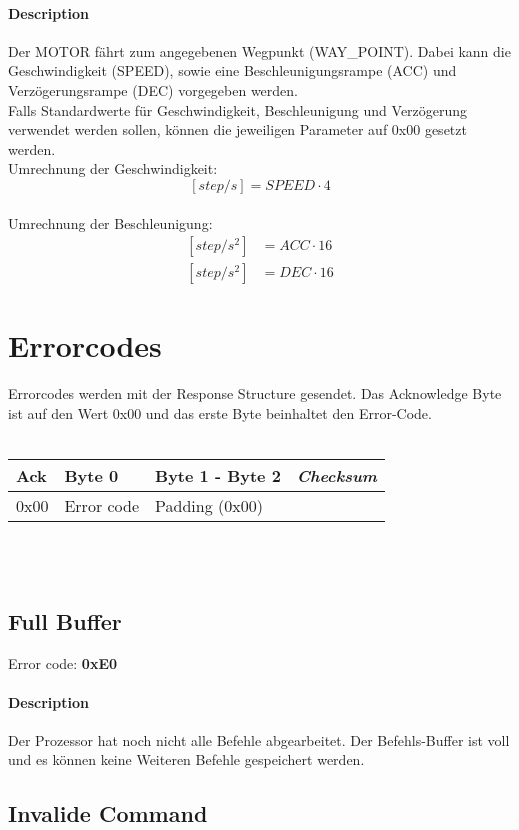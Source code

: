 \documentclass[10pt,a4paper]{article}
\begin{document}
\paragraph*{Description\\}
Der MOTOR fährt zum angegebenen Wegpunkt (WAY\_POINT). Dabei kann die Geschwindigkeit (SPEED), sowie eine Beschleunigungsrampe (ACC) und Verzögerungsrampe (DEC) vorgegeben werden.\\
Falls Standardwerte für Geschwindigkeit, Beschleunigung und Verzögerung verwendet werden sollen, können die jeweiligen Parameter auf 0x00 gesetzt werden.\\
Umrechnung der Geschwindigkeit:
\[
	\left[step/s\right] = SPEED \cdot 4
\]\\
Umrechnung der Beschleunigung:
\[
	\begin{aligned}
		\left[step/s^2\right] &= ACC \cdot 16 \\
		\left[step/s^2\right] &= DEC \cdot 16
	\end{aligned}
\]

\section{Errorcodes}
Errorcodes werden mit der Response Structure gesendet. 
Das Acknowledge Byte ist auf den Wert 0x00 und das erste Byte beinhaltet den Error-Code.\\\\
\begin{tabular}{|p{1.2cm}|p{2cm}|p{4cm}|p{2cm}|}
	\hline
 		Ack & Byte 0 & Byte 1 - Byte 2 & \textit{Checksum}\\\hline
	 	0x00 & Error code & Padding (0x00) & \\ \hline
\end{tabular}\\\\

\subsection{Full Buffer}
Error code: \textbf{0xE0}
\paragraph*{Description\\}
Der Prozessor hat noch nicht alle Befehle abgearbeitet. Der Befehls-Buffer ist voll und es können keine Weiteren Befehle gespeichert werden.

\subsection{Invalide Command}
\end{document}
